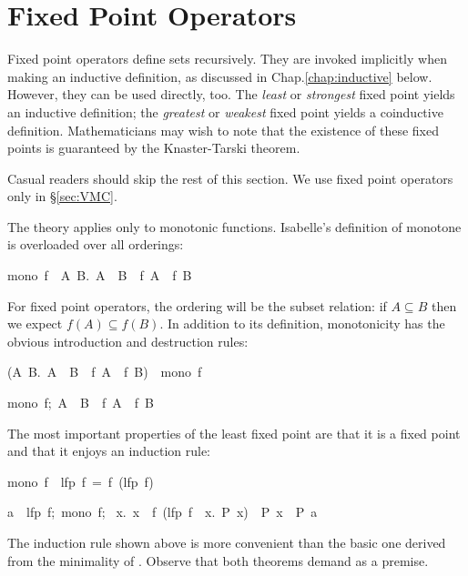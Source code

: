 \section{Fixed Point Operators}

%
Fixed point operators define sets
recursively.  They are invoked implicitly when making an inductive
definition, as discussed in Chap.\ts\ref{chap:inductive} below.  However,
they can be used directly, too. The
\emph{least}  or \emph{strongest} fixed point yields an inductive
definition;  the \emph{greatest} or \emph{weakest} fixed point yields a
coinductive  definition.  Mathematicians may wish to note that the
existence  of these fixed points is guaranteed by the Knaster-Tarski
theorem. 

\begin{warn}
Casual readers should skip the rest of this section.  We use fixed point
operators only in {\S}\ref{sec:VMC}.
\end{warn}

The theory applies only to monotonic functions. 
Isabelle's definition of monotone is overloaded over all orderings:
\begin{isabelle}
mono\ f\ \isasymequiv\ {\isasymforall}A\ B.\ A\ \isasymle\ B\ \isasymlongrightarrow\ f\ A\ \isasymle\ f\ B%
\end{isabelle}
%
For fixed point operators, the ordering will be the subset relation: if
$A\subseteq B$ then we expect $f(A)\subseteq f(B)$.  In addition to its
definition, monotonicity has the obvious introduction and destruction
rules:
\begin{isabelle}
({\isasymAnd}A\ B.\ A\ \isasymle\ B\ \isasymLongrightarrow\ f\ A\ \isasymle\ f\ B)\ \isasymLongrightarrow\ mono\ f%
%
\par\smallskip%
{\isasymlbrakk}mono\ f;\ A\ \isasymle\ B\isasymrbrakk\
\isasymLongrightarrow\ f\ A\ \isasymle\ f\ B%
\end{isabelle}

The most important properties of the least fixed point are that 
it is a fixed point and that it enjoys an induction rule: 
\begin{isabelle}
mono\ f\ \isasymLongrightarrow\ lfp\ f\ =\ f\ (lfp\ f)
%
\par\smallskip%
{\isasymlbrakk}a\ \isasymin\ lfp\ f;\ mono\ f;\isanewline
  \ {\isasymAnd}x.\ x\
\isasymin\ f\ (lfp\ f\ \isasyminter\ \isacharbraceleft x.\ P\
x\isacharbraceright)\ \isasymLongrightarrow\ P\ x\isasymrbrakk\
\isasymLongrightarrow\ P\ a%
\rulename{lfp_induct}
\end{isabelle}
%
The induction rule shown above is more convenient than the basic 
one derived from the minimality of {}.  Observe that both theorems
demand  as a premise.


